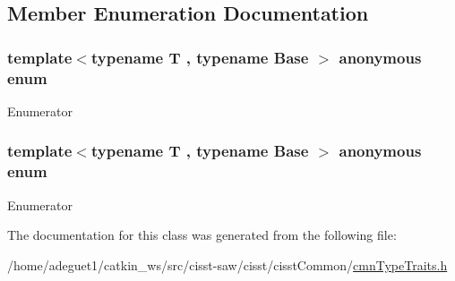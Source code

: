 \subsection{Member Enumeration Documentation}
\hypertarget{classcmn_is_derived_from_a65a36468e89d50a80c11e25cf58c8e75}{\subsubsection[{anonymous enum}]{\setlength{\rightskip}{0pt plus 5cm}template$<$typename T , typename Base $>$ anonymous enum}}\label{classcmn_is_derived_from_a65a36468e89d50a80c11e25cf58c8e75}
\begin{Desc}
\item[Enumerator]\par
\begin{description}
\item[{\em 
\hypertarget{classcmn_is_derived_from_a65a36468e89d50a80c11e25cf58c8e75af3a2348d584176f8c4bfae532328995c}{I\-S\-\_\-\-D\-E\-R\-I\-V\-E\-D}\label{classcmn_is_derived_from_a65a36468e89d50a80c11e25cf58c8e75af3a2348d584176f8c4bfae532328995c}
}]\end{description}
\end{Desc}
\hypertarget{classcmn_is_derived_from_a8c4e19bd9b70a51bfc0d6bd0aea19334}{\subsubsection[{anonymous enum}]{\setlength{\rightskip}{0pt plus 5cm}template$<$typename T , typename Base $>$ anonymous enum}}\label{classcmn_is_derived_from_a8c4e19bd9b70a51bfc0d6bd0aea19334}
\begin{Desc}
\item[Enumerator]\par
\begin{description}
\item[{\em 
\hypertarget{classcmn_is_derived_from_a8c4e19bd9b70a51bfc0d6bd0aea19334a533e6436963bc9d801b91be0244d5050}{I\-S\-\_\-\-N\-O\-T\-\_\-\-D\-E\-R\-I\-V\-E\-D}\label{classcmn_is_derived_from_a8c4e19bd9b70a51bfc0d6bd0aea19334a533e6436963bc9d801b91be0244d5050}
}]\end{description}
\end{Desc}


The documentation for this class was generated from the following file\-:\begin{DoxyCompactItemize}
\item 
/home/adeguet1/catkin\-\_\-ws/src/cisst-\/saw/cisst/cisst\-Common/\hyperlink{cmn_type_traits_8h}{cmn\-Type\-Traits.\-h}\end{DoxyCompactItemize}
